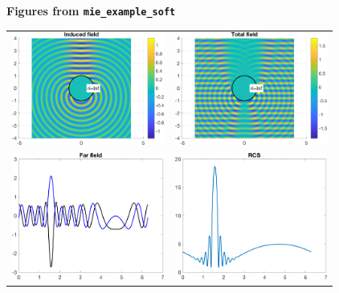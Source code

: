 \documentclass[11pt,letterpaper]{article}
\newcommand{\techheading}[1]{%
    \par\vspace{-0.3\parskip}\noindent\hspace{-1cm}\textbf{#1}%
    \par\vspace{-0.5\parskip}\noindent\nopagebreak\ignorespaces}
\begin{document}
\newpage 
\techheading{Figures from \texttt{mie\_example\_soft}}
\begin{center}
  \begin{tabular}{cc}
    \includegraphics[width=5cm]{mie_example_soft_figure1.png}
    &
    \includegraphics[width=5cm]{mie_example_soft_figure2.png}\\
    \includegraphics[width=5cm]{mie_example_soft_figure3.png}
    &
    \includegraphics[width=5cm]{mie_example_soft_figure4.png}
  \end{tabular}
\end{center}
\end{document}

